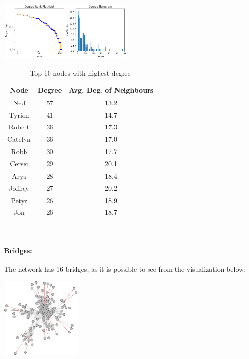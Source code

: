 \documentclass[10pt,twocolumn,letterpaper]{article}
\begin{document}
\begin{center}
    \includegraphics[width=0.5\textwidth]{img/s1/degree_plot.jpg}
\end{center}

\begin{table}[]
    \centering
    \small
    \begin{tabular}{c|c|c}
        Node & Degree & \small{Avg. Deg. of Neighbours}  \\
        \hline
         Ned  &  57 & 13.2 \\
         Tyrion & 41 & 14.7 \\
        Robert & 36 & 17.3 \\
        Catelyn  & 36 & 17.0 \\
        Robb  & 30 & 17.7 \\
        Cersei  & 29 & 20.1 \\
        Arya  & 28 & 18.4 \\
        Joffrey  & 27 & 20.2 \\
        Petyr  & 26 & 18.9 \\
        Jon  & 26 & 18.7 \\
        \hline 
    \end{tabular} \\
    \caption{Top 10 nodes with highest degree}
    \label{tab:my_label}
\end{table}



\paragraph{Bridges:}

The network has 16 bridges, as it is possible to see from the visualization below:

\begin{center}
    \includegraphics[width=0.3\textwidth]{img/s1/bridges.jpg}
\end{center}
\end{document}

